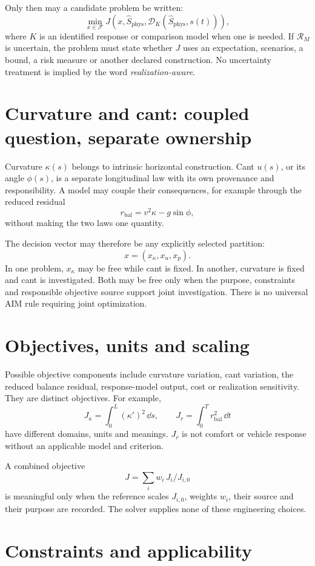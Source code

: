 Only then may a candidate problem be written:
\[
\min_{x\in\mathcal F}
J\!\left(
x,\widehat S_{\mathrm{phys}},
\mathcal D_K(\widehat S_{\mathrm{phys}},s(t))
\right),
\]
where \(K\) is an identified response or comparison model when one is needed.
If \(\mathcal R_M\) is uncertain, the problem must state whether \(J\) uses an
expectation, scenarios, a bound, a risk measure or another declared
construction. No uncertainty treatment is implied by the word
\emph{realization-aware}.

\section{Curvature and cant: coupled question, separate ownership}

Curvature \(\kappa(s)\) belongs to intrinsic horizontal construction. Cant
\(u(s)\), or its angle \(\phi(s)\), is a separate longitudinal law with its
own provenance and responsibility. A model may couple their consequences, for
example through the reduced residual
\[
r_{\mathrm{bal}}=v^2\kappa-g\sin\phi,
\]
without making the two laws one quantity.

The decision vector may therefore be any explicitly selected partition:
\[
x=(x_\kappa,x_u,x_p).
\]
In one problem, \(x_\kappa\) may be free while cant is fixed. In another,
curvature is fixed and cant is investigated. Both may be free only when the
purpose, constraints and responsible objective source support joint
investigation. There is no universal AIM rule requiring joint optimization.

\section{Objectives, units and scaling}

Possible objective components include curvature variation, cant variation,
the reduced balance residual, response-model output, cost or realization
sensitivity. They are distinct objectives. For example,
\[
J_\kappa=\int_0^L(\kappa')^2\,\dd s,
\qquad
J_r=\int_0^T r_{\mathrm{bal}}^2\,\dd t
\]
have different domains, units and meanings. \(J_r\) is not comfort or vehicle
response without an applicable model and criterion.

A combined objective
\[
J=\sum_i w_i\,J_i/J_{i,0}
\]
is meaningful only when the reference scales \(J_{i,0}\), weights \(w_i\),
their source and their purpose are recorded. The solver supplies none of
these engineering choices.

\section{Constraints and applicability}

